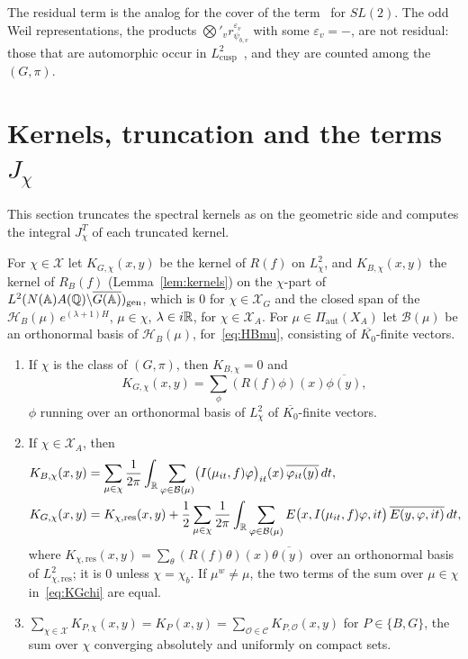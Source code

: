 The residual term is the analog for the cover of the
term~\cite[(5.5)]{LL79} for $SL(2)$. The odd Weil representations, the
products $\bigotimes'_vr^{\varepsilon_v}_{\psi_{b,v}}$ with some
$\varepsilon_v=-$, are not residual: those that are automorphic occur in
$L^2_{\mathrm{cusp}}$~\cite{GPS80,Wa80}, and they are counted among the
$(G,\pi)$.

\section{Kernels, truncation and the terms \texorpdfstring{$J_\chi$}{J\_chi}}\label{sec:Jchi}

This section truncates the spectral kernels as on the geometric side
and computes the integral $J^T_\chi$ of each truncated kernel.


For $\chi\in\mathcal X$ let $K_{G,\chi}(x,y)$ be the kernel of $R(f)$ on
$L^2_\chi$, and $K_{B,\chi}(x,y)$ the kernel of $R_B(f)$
(Lemma~\ref{lem:kernels}) on the $\chi$-part of
$L^2(N(\mathbb{A})A(\mathbb{Q})\backslash\overline{G(\mathbb{A})})_{\mathrm{gen}}$, which is $0$ for
$\chi\in\mathcal X_G$ and the closed span of the $\mathcal H_B(\mu)\,
e^{(\lambda+1)H}$, $\mu\in\chi$, $\lambda\in i\mathbb{R}$, for $\chi\in\mathcal X_A$.
For $\mu\in\Pi_{\mathrm{aut}}(X_A)$ let $\mathcal B(\mu)$ be an orthonormal
basis of $\mathcal H_B(\mu)$, for~\eqref{eq:HBmu}, consisting of
$\overline{K_0}$-finite vectors.

\begin{proposition}\label{prop:kernels-spec}
\begin{enumerate}[label=(\alph*)]
\item If $\chi$ is the class of $(G,\pi)$, then $K_{B,\chi}=0$ and
  \[
  K_{G,\chi}(x,y)=\sum_\phi(R(f)\phi)(x)\overline{\phi(y)},
  \]
  $\phi$ running over an orthonormal basis of $L^2_\chi$ of
  $\overline{K_0}$-finite vectors.
\item If $\chi\in\mathcal X_A$, then
  \begin{align}
  K_{B,\chi}(x,y)&=\sum_{\mu\in\chi}\frac1{2\pi}\int_{\mathbb{R}}\sum_{\varphi\in
  \mathcal B(\mu)}\bigl(I(\mu_{it},f)\varphi\bigr)_{it}(x)\,
  \overline{\varphi_{it}(y)}\,dt,\label{eq:KBchi}\\
  K_{G,\chi}(x,y)&=K_{\chi,\mathrm{res}}(x,y)+\frac12\sum_{\mu\in\chi}
  \frac1{2\pi}\int_{\mathbb{R}}\sum_{\varphi\in\mathcal B(\mu)}
  E\bigl(x,I(\mu_{it},f)\varphi,it\bigr)\,\overline{E(y,\varphi,it)}\,dt,
  \label{eq:KGchi}
  \end{align}
  where $K_{\chi,\mathrm{res}}(x,y)=\sum_\theta(R(f)\theta)(x)
  \overline{\theta(y)}$ over an orthonormal basis of
  $L^2_{\chi,\mathrm{res}}$; it is $0$ unless $\chi=\chi_b$. If
  $\mu^w\ne\mu$, the two terms of the sum over $\mu\in\chi$
  in~\eqref{eq:KGchi} are equal.
\item $\sum_{\chi\in\mathcal X}K_{P,\chi}(x,y)=K_P(x,y)=
  \sum_{\mathcal O\in\mathcal C}K_{P,\mathcal O}(x,y)$ for $P\in\{B,G\}$, the
  sum over $\chi$ converging absolutely and uniformly on compact sets.
\end{enumerate}
\end{proposition}


